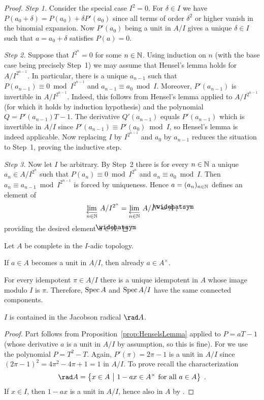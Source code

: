 \documentclass[a4paper,parskip=half,numbers=enddot, DIV=12]{scrreprt}
\begin{document}
\begin{proof}
	\emph{Step 1.} Consider the special case $I^2=0$. For $\delta\in I$ we have $P(a_0+\delta)=P(a_0)+\delta P'(a_0)$ since all terms of order $\delta^2$ or higher vanish in the binomial expansion. Now $P'(a_0)$ being a unit in $A/I$ gives a unique $\delta\in I$ such that $a=a_0+\delta$ satisfies $P(a)=0$.
	
	\emph{Step 2.} Suppose that $I^{2^n}=0$ for some $n\in \mathbb{N}$. Using induction on $n$ (with the base case being precisely Step~1) we may assume that Hensel's lemma holds for $A/I^{2^{n-1}}$. In particular, there is a unique $a_{n-1}$ such that $P(a_{n-1})\equiv 0\bmod I^{2^{n-1}}$ and $a_{n-1}\equiv a_0\bmod I$. Moreover, $P'(a_{n-1})$ is invertible in $A/I^{2^{n-1}}$. Indeed, this follows from Hensel's lemma applied to $A/I^{2^{n-1}}$ (for which it holds by induction hypothesis) and the polynomial $Q=P'(a_{n-1})T-1$. The derivative $Q'(a_{n-1})$ equals $P'(a_{n-1})$ which is invertible in $A/I$ since $P'(a_{n-1})\equiv P'(a_0)\bmod I$, so Hensel's lemma is indeed applicable. Now replacing $I$ by $I^{2^{n-1}}$ and $a_0$ by $a_{n-1}$ reduces the situation to Step~1, proving the inductive step.
	
	\emph{Step 3.} Now let $I$ be arbitrary. By Step~2 there is for every $n\in\mathbb{N}$ a unique $a_n\in A/I^{2^n}$ such that $P(a_n)\equiv 0\bmod I^{2^n}$ and $a_n\equiv a_0\bmod I$. Then $a_n\equiv a_{n-1}\bmod I^{2^{n-1}}$ is forced by uniqueness. Hence $a=(a_n)_{n\in \mathbb{N}}$ defines an element of
	\begin{align*}
		\limit[n\in \IN]A/I^{2^n}=\limit[n\in\IN] A/I^n=\roof{A}\;,
	\end{align*}
	providing the desired element $a\in\roof{A}$.
\end{proof}
\begin{cor}
	Let $A$ be complete in the $I$-adic topology.
	\begin{alphanumerate}
		\item If $a\in A$ becomes a unit in $A/I$, then already $a\in A^\times$.
		\item For every idempotent $\pi\in A/I$ there is a unique idempotent in $A$ whose image modulo $I$ is $\pi $. Therefore, $\operatorname{Spec} A$ and $\operatorname{Spec} A/I$ have the same connected components.
		\item $I$ is contained in the Jacobson radical $\rad A$.
	\end{alphanumerate}
\end{cor}
\begin{proof}
	Part  follows from Proposition~\ref{prop:HenselsLemma} applied to $P=aT-1$ (whose derivative $a$ is a unit in $A/I$ by assumption, so this is fine). For  we use the polynomial $P=T^2-T$. Again, $P'(\pi )=2\pi -1$ is a unit in $A/I$ since $(2\pi -1)^2=4\pi ^2-4\pi +1=1$ in $A/I$. To prove  recall the characterization
	\begin{align*}
		\rad A=\left\{x\in A\st 1-ax\in A^\times\text{ for all }a\in A\right\}\;.
	\end{align*}
	If $x\in I$, then $1-ax$ is a unit in $A/I$, hence also in $A$ by .
\end{proof}
\end{document}
